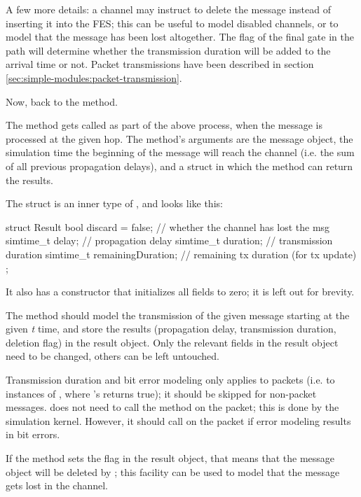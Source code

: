 \begin{ned}
A few more details: a channel may instruct {\opp} to delete the message
instead of inserting it into the FES; this can be useful to model
disabled channels, or to model that the message has been lost altogether.
The  flag of the final gate in the path
will determine whether the transmission duration will be added to the
arrival time or not. Packet transmissions have been described in section
\ref{sec:simple-modules:packet-transmission}.

Now, back to the  method.

The method gets called as part of the above process, when the message
is processed at the given hop. The method's arguments are the message
object, the simulation time the beginning of the message will reach
the channel (i.e. the sum of all previous propagation delays),
and a struct in which the method can return the results.

The  struct is an inner type of ,
and looks like this:

\begin{cpp}
struct Result
{
    bool discard = false;        // whether the channel has lost the msg
    simtime_t delay;             // propagation delay
    simtime_t duration;          // transmission duration
    simtime_t remainingDuration; // remaining tx duration (for tx update)
};
\end{cpp}

It also has a constructor that initializes all fields to zero; it is left
out for brevity.

The method should model the transmission of the given message starting at
the given \textit{t} time, and store the results (propagation delay,
transmission duration, deletion flag) in the result object. Only the
relevant fields in the result object need to be changed, others can be left
untouched.

Transmission duration and bit error modeling only applies to packets (i.e.
to instances of , where 's
 returns true); it should be skipped for non-packet
messages.  does not need to call the 
method on the packet; this is done by the simulation kernel. However,
it should call  on the packet
if error modeling results in bit errors.

If the method sets the  flag in the result object, that
means that the message object will be deleted by {\opp}; this facility
can be used to model that the message gets lost in the channel.


\end{ned}
